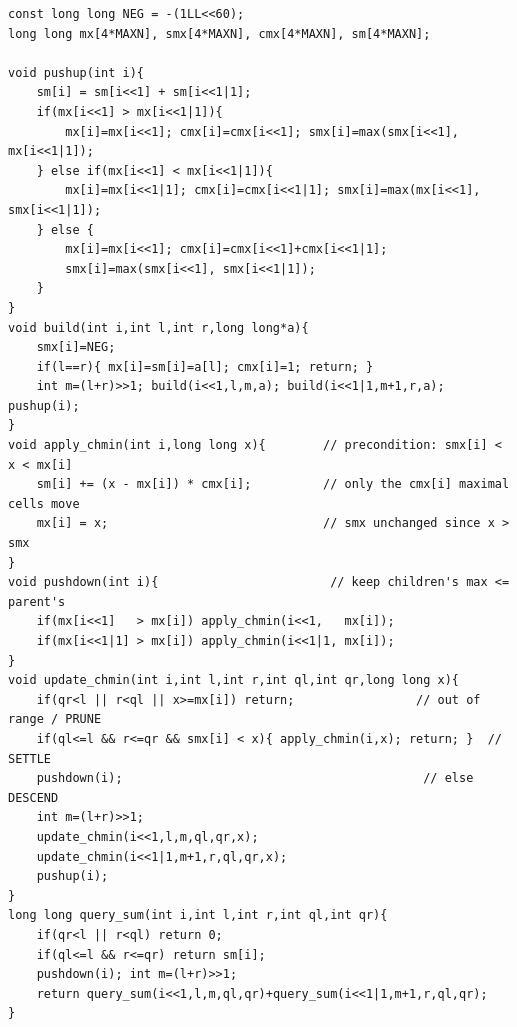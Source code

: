 \begin{lstlisting}[caption={Segment-tree beats core: range chmin with range sum. The node keeps max, second-max smax, count of max, and sum; the update prunes, settles in place, or descends. ASCII only}, label={lst:c29-beats}]
const long long NEG = -(1LL<<60);
long long mx[4*MAXN], smx[4*MAXN], cmx[4*MAXN], sm[4*MAXN];

void pushup(int i){
    sm[i] = sm[i<<1] + sm[i<<1|1];
    if(mx[i<<1] > mx[i<<1|1]){
        mx[i]=mx[i<<1]; cmx[i]=cmx[i<<1]; smx[i]=max(smx[i<<1], mx[i<<1|1]);
    } else if(mx[i<<1] < mx[i<<1|1]){
        mx[i]=mx[i<<1|1]; cmx[i]=cmx[i<<1|1]; smx[i]=max(mx[i<<1], smx[i<<1|1]);
    } else {
        mx[i]=mx[i<<1]; cmx[i]=cmx[i<<1]+cmx[i<<1|1];
        smx[i]=max(smx[i<<1], smx[i<<1|1]);
    }
}
void build(int i,int l,int r,long long*a){
    smx[i]=NEG;
    if(l==r){ mx[i]=sm[i]=a[l]; cmx[i]=1; return; }
    int m=(l+r)>>1; build(i<<1,l,m,a); build(i<<1|1,m+1,r,a); pushup(i);
}
void apply_chmin(int i,long long x){        // precondition: smx[i] < x < mx[i]
    sm[i] += (x - mx[i]) * cmx[i];          // only the cmx[i] maximal cells move
    mx[i] = x;                              // smx unchanged since x > smx
}
void pushdown(int i){                        // keep children's max <= parent's
    if(mx[i<<1]   > mx[i]) apply_chmin(i<<1,   mx[i]);
    if(mx[i<<1|1] > mx[i]) apply_chmin(i<<1|1, mx[i]);
}
void update_chmin(int i,int l,int r,int ql,int qr,long long x){
    if(qr<l || r<ql || x>=mx[i]) return;                 // out of range / PRUNE
    if(ql<=l && r<=qr && smx[i] < x){ apply_chmin(i,x); return; }  // SETTLE
    pushdown(i);                                          // else DESCEND
    int m=(l+r)>>1;
    update_chmin(i<<1,l,m,ql,qr,x);
    update_chmin(i<<1|1,m+1,r,ql,qr,x);
    pushup(i);
}
long long query_sum(int i,int l,int r,int ql,int qr){
    if(qr<l || r<ql) return 0;
    if(ql<=l && r<=qr) return sm[i];
    pushdown(i); int m=(l+r)>>1;
    return query_sum(i<<1,l,m,ql,qr)+query_sum(i<<1|1,m+1,r,ql,qr);
}
\end{lstlisting}

